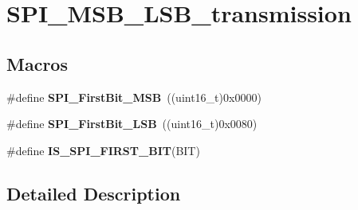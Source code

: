 \hypertarget{group___s_p_i___m_s_b___l_s_b__transmission}{\section{S\-P\-I\-\_\-\-M\-S\-B\-\_\-\-L\-S\-B\-\_\-transmission}
\label{group___s_p_i___m_s_b___l_s_b__transmission}
}
\subsection*{Macros}
\begin{DoxyCompactItemize}
\item 
\hypertarget{group___s_p_i___m_s_b___l_s_b__transmission_ga45e688f93a93b605886240cad23bc2eb}{\#define {\bfseries S\-P\-I\-\_\-\-First\-Bit\-\_\-\-M\-S\-B}~((uint16\-\_\-t)0x0000)}\label{group___s_p_i___m_s_b___l_s_b__transmission_ga45e688f93a93b605886240cad23bc2eb}

\item 
\hypertarget{group___s_p_i___m_s_b___l_s_b__transmission_ga5ef57fca79434cbc517e4ede548ca02d}{\#define {\bfseries S\-P\-I\-\_\-\-First\-Bit\-\_\-\-L\-S\-B}~((uint16\-\_\-t)0x0080)}\label{group___s_p_i___m_s_b___l_s_b__transmission_ga5ef57fca79434cbc517e4ede548ca02d}

\item 
\#define {\bfseries I\-S\-\_\-\-S\-P\-I\-\_\-\-F\-I\-R\-S\-T\-\_\-\-B\-I\-T}(B\-I\-T)
\end{DoxyCompactItemize}


\subsection{Detailed Description}



